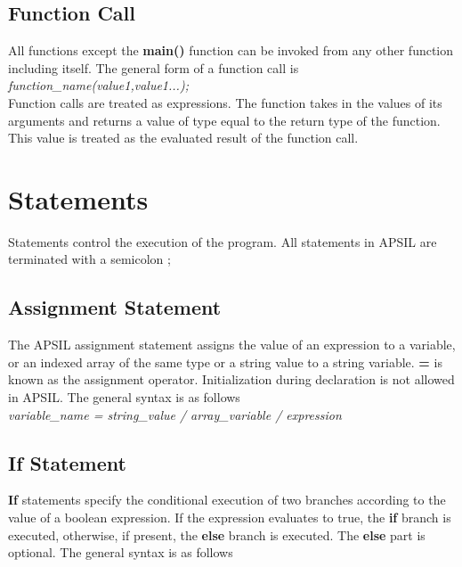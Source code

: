 \subsection{Function Call}

All functions except the \textbf{main()} function can be invoked from any other function including itself. The general form of a function call is \\

\textit{function\_name(value1,value1...);}
\\

Function calls are treated as expressions. The function takes in the values of its arguments and returns a value of type equal to the return type of the function. This value is treated as the evaluated result of the function call.




\section{Statements}

Statements control the execution of the program. All statements in APSIL are terminated with a semicolon ;





\subsection{Assignment Statement}
The APSIL assignment statement assigns the value of an expression to a variable, or an indexed array of the same type or a string value to a string variable. \textbf{=} is known as the assignment operator. Initialization during declaration is not allowed in APSIL. The general syntax is as follows \\
\textit{ variable\_name = string\_value / array\_variable / expression }






\subsection{If Statement}
\textbf{If} statements specify the conditional execution of two branches according to the value of a boolean expression. If the expression evaluates to true, the \textbf{if} branch is executed, otherwise, if present, the \textbf{else}  branch is executed. The \textbf{else} part is optional. The general syntax is as follows  \\

